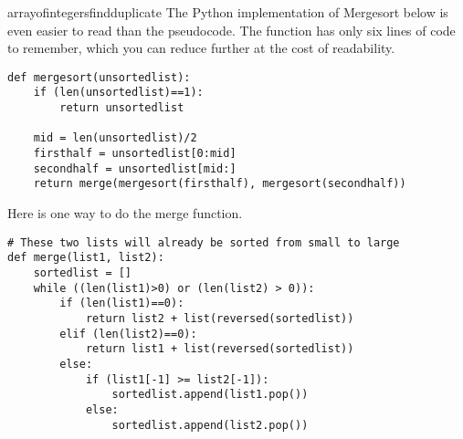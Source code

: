 \begin{answer}{arrayofintegersfindduplicate}
The Python implementation of Mergesort below is even easier to read than the pseudocode.
The function has only six lines of code to remember, which you can reduce further at the cost of readability.
\begin{verbatim}
def mergesort(unsortedlist):
    if (len(unsortedlist)==1):
        return unsortedlist

    mid = len(unsortedlist)/2
    firsthalf = unsortedlist[0:mid]
    secondhalf = unsortedlist[mid:]
    return merge(mergesort(firsthalf), mergesort(secondhalf))
\end{verbatim}
Here is one way to do the merge function.
\begin{verbatim}
# These two lists will already be sorted from small to large
def merge(list1, list2):
    sortedlist = []
    while ((len(list1)>0) or (len(list2) > 0)):
        if (len(list1)==0):
            return list2 + list(reversed(sortedlist))
        elif (len(list2)==0):
            return list1 + list(reversed(sortedlist))
        else:
            if (list1[-1] >= list2[-1]):
                sortedlist.append(list1.pop())
            else:
                sortedlist.append(list2.pop())

\end{verbatim}
\end{answer}
